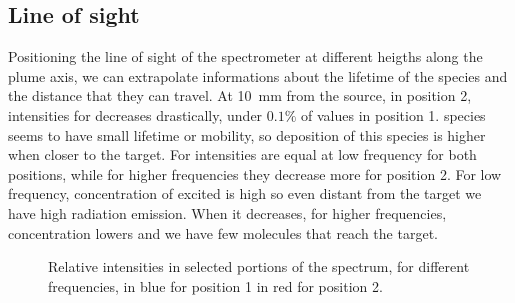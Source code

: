 \subsection{Line of sight}
Positioning the line of sight of the spectrometer at different heigths along the plume axis, we can extrapolate informations about the lifetime of the species and the distance that they can travel. 
At \SI{10}{\milli\meter} from the source, in position 2, intensities for  decreases drastically, under $0.1\%$ of values in position 1.  species seems to have small lifetime or mobility, so deposition of this species is higher when closer to the target.
For  intensities are equal at low frequency for both positions, while for higher frequencies they decrease more for position 2. For low frequency, concentration of excited  is high so even distant from the target we have high radiation emission. When it decreases, for higher frequencies, concentration lowers and we have few molecules that reach the target.
\begin{figure}
\centering
 \hspace{0.55\textwidth}
 \hfill
 \caption{Relative intensities in selected portions of the spectrum, for different frequencies, in blue for position 1 in red for position 2.}
 \label{fig:irel}
\end{figure}


